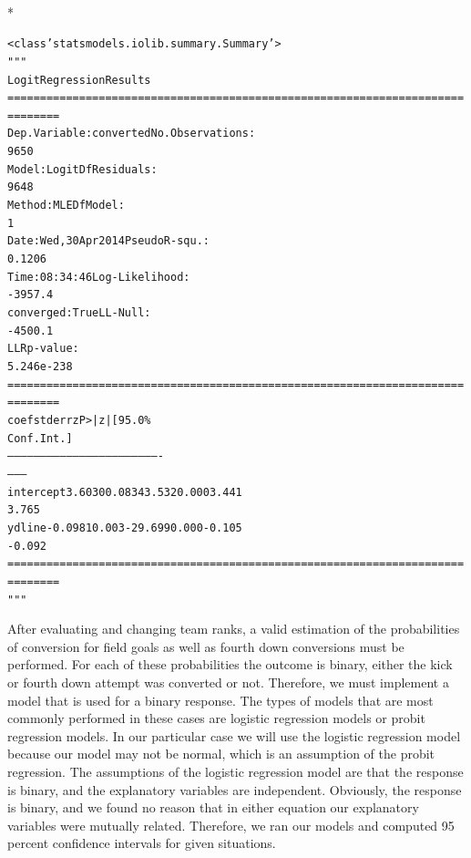 \documentclass[letterpaper,10pt,english]{/anaconda/lib/python2.7/site-packages/sphinx/texinputs/sphinxhowto}
\def\smaller{\fontsize{9.5pt}{9.5pt}\selectfont}
\newenvironment{InvisibleVerbatim}
        {\begin{mdframed}[leftmargin=0.1\linewidth,innerleftmargin=3pt,innerrightmargin=3pt, userdefinedwidth=1\linewidth, linewidth=0pt, linecolor=white, usetwoside=false]}
        {\end{mdframed}}
\begin{document}
                \makebox[0.1\linewidth]{\smaller\hfill\tt\color{nbframe-out-prompt}Out\hspace{4pt}{[}23{]}:\hspace{4pt}}\\*
                \vspace{-2.55\baselineskip}\begin{InvisibleVerbatim}
                \vspace{-0.5\baselineskip}
\begin{alltt}<class 'statsmodels.iolib.summary.Summary'>
"""
                           Logit Regression Results
======================================================================
========
Dep. Variable:              converted   No. Observations:
9650
Model:                          Logit   Df Residuals:
9648
Method:                           MLE   Df Model:
1
Date:                Wed, 30 Apr 2014   Pseudo R-squ.:
0.1206
Time:                        08:34:46   Log-Likelihood:
-3957.4
converged:                       True   LL-Null:
-4500.1
                                        LLR p-value:
5.246e-238
======================================================================
========
                 coef    std err          z      P>|z|      [95.0\%
Conf. Int.]
----------------------------------------------------------------------
--------
intercept      3.6030      0.083     43.532      0.000         3.441
3.765
ydline        -0.0981      0.003    -29.699      0.000        -0.105
-0.092
======================================================================
========
"""\end{alltt}

            \end{InvisibleVerbatim}
            
        
    

After evaluating and changing team ranks, a valid estimation of the
probabilities of conversion for field goals as well as fourth down
conversions must be performed. For each of these probabilities the
outcome is binary, either the kick or fourth down attempt was converted
or not. Therefore, we must implement a model that is used for a binary
response. The types of models that are most commonly performed in these
cases are logistic regression models or probit regression models. In our
particular case we will use the logistic regression model because our
model may not be normal, which is an assumption of the probit
regression. The assumptions of the logistic regression model are that
the response is binary, and the explanatory variables are independent.
Obviously, the response is binary, and we found no reason that in either
equation our explanatory variables were mutually related. Therefore, we
ran our models and computed 95 percent confidence intervals for given
situations.
\end{document}
